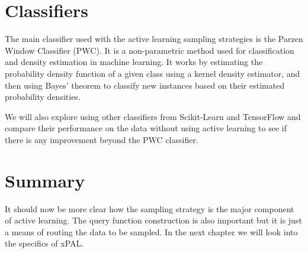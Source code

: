 \section{Classifiers}

The main classifier used with the active learning sampling strategies is the Parzen Window Classifier (PWC). It is a non-parametric method used for classification and density estimation in machine learning. It works by estimating the probability density function of a given class using a kernel density estimator, and then using Bayes' theorem to classify new instances based on their estimated probability densities.

We will also explore using other classifiers from Scikit-Learn and TensorFlow and compare their performance on the data without using active learning to see if there is any improvement beyond the PWC classifier.

\section{Summary}
It should now be more clear how the sampling strategy is the major component of active learning. The query function construction is also important but it is just a means of routing the data to be sampled. In the next chapter we will look into the specifics of xPAL.
